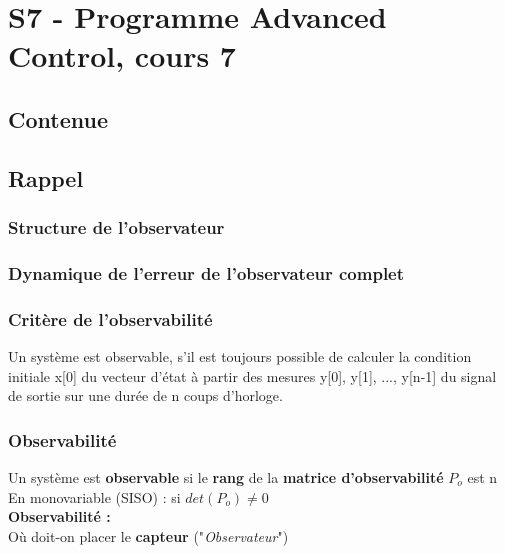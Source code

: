 \documentclass[document.tex]{subfiles}
\begin{document}
\section{S7 - Programme Advanced Control, cours 7}


\subsection{Contenue}


\subsection{Rappel}

\subsubsection{Structure de l'observateur}


\subsubsection{Dynamique de l'erreur de l'observateur complet}


\subsubsection{Critère de l'observabilité}


Un système est observable, s'il est toujours possible de calculer la condition initiale x[0] du vecteur d'état à partir des mesures y[0], y[1], ..., y[n-1] du signal de sortie sur une durée de n coups d'horloge.\\

\subsubsection{Observabilité}



Un système est \textbf{observable} si le \textbf{rang} de la \textbf{matrice d'observabilité} $P_o$ est n\\
En monovariable (SISO) : si $det(P_o)\neq 0$\\


\textbf{Observabilité :}\\
Où doit-on placer le \textbf{capteur} ("\textit{Observateur}")
\end{document}
